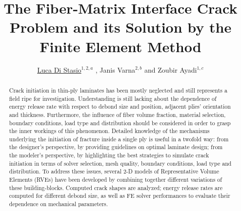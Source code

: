 \documentclass[a4paper]{jpconf}
\begin{document}

\title{The Fiber-Matrix Interface Crack Problem and its Solution by the Finite Element Method}

\author{\underline{Luca Di Stasio}$^{1,2,a}$ , Janis Varna$^{2,b}$ and Zoubir Ayadi$^{1,c}$ }

\address{$^{1}$SI2M, IJL, EEIGM, Universit\'e de Lorraine, 6 Rue Bastien Lepage, F-54010 Nancy, France\\$^{2}$Division of Polymer Engineering, Lule\aa\ University of Technology, SE-97187 Lule\aa , Sweden }

{\vspace*{5pt}\address{E-mail: $^{a}$luca.di-stasio@univ-lorraine.fr, $^{b}$janis.varna@ltu.se, $^{c}$zoubir.ayadi@univ-lorraine.fr}}


\begin{abstract}
Crack initiation in thin-ply laminates has been mostly neglected and still represents a field ripe for investigation. Understanding is still lacking about the dependence of energy release rate with respect to debond size and position, adjacent plies’ orientation and thickness. Furthermore, the influence of fiber volume fraction, material selection, boundary conditions, load type and distribution should be considered in order to grasp the inner workings of this phenomenon. Detailed knowledge of the mechanisms underlying the initiation of fracture inside a single ply is useful in a twofold way: from the designer’s perspective, by providing guidelines on optimal laminate design; from the modeler’s perspective, by highlighting the best strategies to simulate crack initiation in terms of solver selection, mesh quality, boundary conditions, load type and distribution. To address these issues, several 2-D models of Representative Volume Elements (RVEs) have been developed by combining together different variations of these building-blocks. Computed crack shapes are analyzed; energy release rates are computed for different debond size, as well as FE solver performances to evaluate their dependence on mechanical parameters.
\end{abstract}
\end{document}
